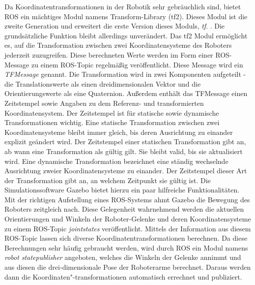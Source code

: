 Da Koordinatentransformationen in der Robotik sehr gebräuchlich sind, bietet ROS ein mächtiges Modul namens Transform-Library (tf2). Dieses Modul ist die zweite Generation und erweitert die erste Version dieses Moduls, \emph{tf}. \autocite{foote_tf2_wiki_2019}. Die grundsätzliche Funktion bleibt allerdings unverändert. Das tf2 Modul ermöglicht es, auf die Transformation zwischen zwei Koordinatensysteme des Roboters jederzeit zuzugreifen. Diese berechneten Werte werden im Form einer ROS-Message zu einem ROS-Topic regelmäßig veröffentlicht. Diese Message wird ein \emph{TFMessage} genannt. Die Transformation wird in zwei Komponenten aufgeteilt - die Translationswerte als einen dreidimensionalen Vektor und die Orientierungswerte als eine Quaternion. Außerdem enthält das TFMessage einen Zeitstempel sowie Angaben zu dem Referenz- und transformierten Koordinatensystem. Der Zeitstempel ist für statische sowie dynamische Transformationen wichtig. Eine statische Transformation zwischen zwei Koordinatensysteme bleibt immer gleich, bis deren Ausrichtung zu einander explizit geändert wird. Der Zeitstempel einer statischen Transformation gibt an, ab wann eine Transformation als gültig gilt. Sie bleibt valid, bis sie aktualisiert wird. Eine dynamische Transformation bezeichnet eine ständig wechselnde Ausrichtung zweier Koordinatensysteme zu einander. Der Zeitstempel dieser Art der Transformation gibt an, an welchem Zeitpunkt sie gültig ist. Die Simulationssoftware Gazebo bietet hierzu ein paar hilfreiche Funktionalitäten. Mit der richtigen Aufstellung eines ROS-Systems ahmt Gazebo die Bewegung des Roboters zeitgleich nach. Diese Gelegenheit wahrnehmend werden die aktuellen Orientierungen und Winkeln der Roboter-Gelenke und deren Koordinatensysteme zu einem ROS-Topic \emph{joint\textunderscore states} veröffentlicht. Mittels der Information aus diesem ROS-Topic lassen sich diverse Koordinatentransformationen berechnen. Da diese Berechnungen sehr häufig gebraucht werden, wird durch ROS ein Modul namens \emph{robot \textunderscore state\textunderscore publisher} angeboten, welches die Winkeln der Gelenke annimmt und aus diesen die drei-dimensionale Pose der Roboterarme berechnet. Daraus werden dann die Koordinaten"-transformationen automatisch errechnet und publiziert. \autocite[156-160]{NewmanWyattS2018ASAt}

